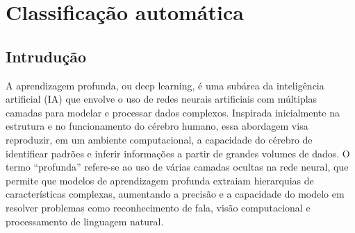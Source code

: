 \chapter{Classificação automática}
\label{cap:dl}


\begin{overview}
  \lipsum[1]
\end{overview}


\section{Intrudução}
A aprendizagem profunda, ou deep learning, é uma subárea da inteligência artificial (IA) que envolve o uso de redes neurais artificiais com múltiplas camadas para modelar e processar dados complexos. Inspirada inicialmente na estrutura e no funcionamento do cérebro humano, essa abordagem visa reproduzir, em um ambiente computacional, a capacidade do cérebro de identificar padrões e inferir informações a partir de grandes volumes de dados. O termo ``profunda'' refere-se ao uso de várias camadas ocultas na rede neural, que permite que modelos de aprendizagem profunda extraiam hierarquias de características complexas, aumentando a precisão e a capacidade do modelo em resolver problemas como reconhecimento de fala, visão computacional e processamento de linguagem natural.




